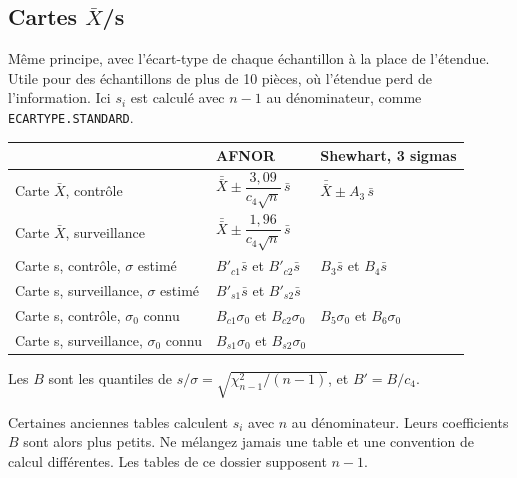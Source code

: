 \documentclass[11pt,a4paper]{article}
\newcommand{\xbb}{\bar{\bar{X}}}
\newcommand{\xl}[1]{\texttt{\small #1}}
\begin{document}
\subsection{Cartes \texorpdfstring{$\bar X$}{X}/s}
Même principe, avec l'écart-type de chaque échantillon à la place de l'étendue. Utile pour des échantillons de plus de 10 pièces, où l'étendue perd de l'information. Ici $s_i$ est calculé avec $n-1$ au dénominateur, comme \xl{ECARTYPE.STANDARD}.
\begin{center}\small
\renewcommand{\arraystretch}{1.6}
\begin{tabular}{@{}lll@{}}\toprule
 & \textbf{AFNOR} & \textbf{Shewhart, 3 sigmas}\\\midrule
Carte $\bar X$, contrôle & $\xbb\pm\dfrac{3{,}09}{c_4\sqrt n}\,\bar s$ & $\xbb\pm A_3\,\bar s$\\
Carte $\bar X$, surveillance & $\xbb\pm\dfrac{1{,}96}{c_4\sqrt n}\,\bar s$ & \\
Carte s, contrôle, $\sigma$ estimé & $B'_{c1}\bar s$ et $B'_{c2}\bar s$ & $B_3\bar s$ et $B_4\bar s$\\
Carte s, surveillance, $\sigma$ estimé & $B'_{s1}\bar s$ et $B'_{s2}\bar s$ & \\
Carte s, contrôle, $\sigma_0$ connu & $B_{c1}\sigma_0$ et $B_{c2}\sigma_0$ & $B_5\sigma_0$ et $B_6\sigma_0$\\
Carte s, surveillance, $\sigma_0$ connu & $B_{s1}\sigma_0$ et $B_{s2}\sigma_0$ & \\\bottomrule
\end{tabular}
\end{center}
Les $B$ sont les quantiles de $s/\sigma=\sqrt{\chi^2_{n-1}/(n-1)}$, et $B'=B/c_4$.

\begin{note}
Certaines anciennes tables calculent $s_i$ avec $n$ au dénominateur. Leurs coefficients $B$ sont alors plus petits. Ne mélangez jamais une table et une convention de calcul différentes. Les tables de ce dossier supposent $n-1$.
\end{note}
\end{document}
